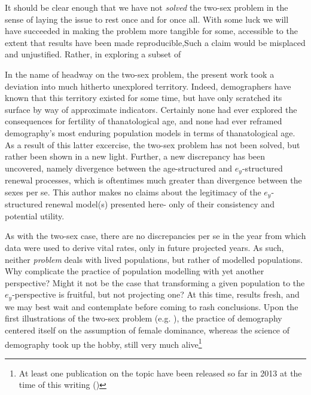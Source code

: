 \FloatBarrier

It should be clear enough that we have not \textit{solved} the two-sex problem
in the sense of laying the issue to rest once and for once all. With some
luck we will have succeeded in making the problem more tangible for some,
accessible to the extent that results have been made reproducible,Such a claim
would be misplaced and unjustified. Rather, in exploring a subset of



In the name of headway on the two-sex problem, the
present work took a deviation into much hitherto unexplored territory. Indeed,
demographers have known that this territory existed for some time, but have
only scratched its surface by way of approximate indicators. Certainly none had
ever explored the consequences for fertility of thanatological age, and none had
ever reframed demography's most enduring population models in terms of
thanatological age. As a result of this latter excercise, the two-sex problem
has not been solved, but rather been shown in a new light. Further, a new discrepancy 
has been uncovered, namely divergence between the age-structured and $e_y$-structured 
renewal processes, which is oftentimes much greater than divergence between 
the sexes per se. This author makes no claims about the legitimacy of 
the $e_y$-structured renewal model(s) presented here- only of their 
consistency and potential utility. 

As with the two-sex case, there are no
discrepancies per se in the year from which data were used to derive vital
rates, only in future projected years. As such, neither \textit{problem} deals with lived populations, but rather of
modelled populations. Why complicate the practice of population modelling with yet
another perspective? Might it not be the case that transforming a given
population to the $e_y$-perspective is fruitful, but not projecting one? At this
time, results fresh, and we may best wait and contemplate before coming to rash
conclusions. Upon the first illustrations of the two-sex problem (e.g.
\cite{kuczynski1932fertility}), the practice of demography centered itself on
the assumption of female dominance, whereas the science of demography took up
the hobby, still very much alive\footnote{At least one publication on the
topic have been released so far in 2013 at the time of this writing (\citet{Matthews2013})}



